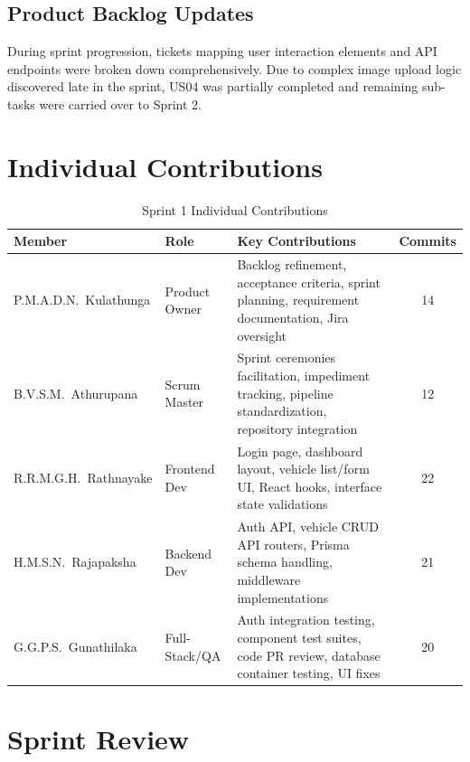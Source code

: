 \documentclass[12pt,a4paper]{article}
\newcommand{\thead}[1]{\textbf{\color{white}#1}}
\begin{document}
\subsection{Product Backlog Updates}

During sprint progression, tickets mapping user interaction elements and API endpoints were broken down comprehensively. Due to complex image upload logic discovered late in the sprint, US04 was partially completed and remaining sub-tasks were carried over to Sprint 2.

\section{Individual Contributions}

\begin{table}[H]
\centering
\renewcommand{\arraystretch}{1.35}
\footnotesize
\begin{tabularx}{\textwidth}{|l|l|Y|c|}
\hline
{} \thead{Member} & \thead{Role} & \thead{Key Contributions} & \thead{Commits} \\
\hline
P.M.A.D.N.\ Kulathunga & Product Owner & Backlog refinement, acceptance criteria, sprint planning, requirement documentation, Jira oversight & 14 \\
\hline
{}
B.V.S.M.\ Athurupana & Scrum Master & Sprint ceremonies facilitation, impediment tracking, pipeline standardization, repository integration & 12 \\
\hline
R.R.M.G.H.\ Rathnayake & Frontend Dev & Login page, dashboard layout, vehicle list/form UI, React hooks, interface state validations & 22 \\
\hline
{}
H.M.S.N.\ Rajapaksha & Backend Dev & Auth API, vehicle CRUD API routers, Prisma schema handling, middleware implementations & 21 \\
\hline
G.G.P.S.\ Gunathilaka & Full-Stack/QA & Auth integration testing, component test suites, code PR review, database container testing, UI fixes & 20 \\
\hline
\end{tabularx}
\caption{Sprint 1 Individual Contributions}
\end{table}

\section{Sprint Review}
\end{document}
